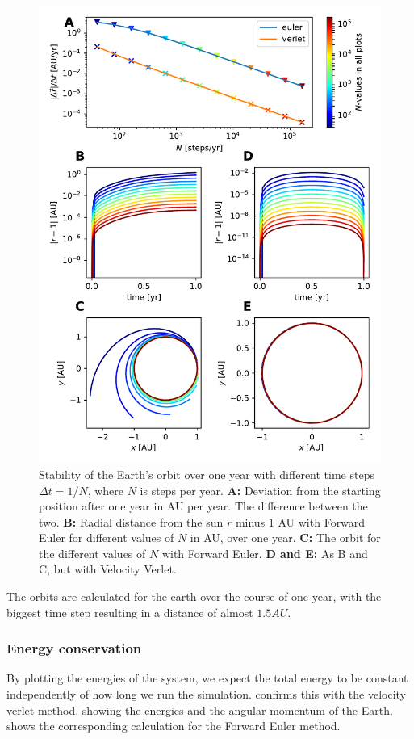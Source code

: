 \documentclass[10pt]{article}
\begin{document}
\begin{multicols}{2}
\begin{figure}[H]
    \centering
    \includegraphics[width=1.0\linewidth]{../results/stability.pdf}
    \caption{Stability of the Earth's orbit over one year with different
    time steps $\Delta t = 1/N$, where $N$ is steps per year. \textbf{A:}
    Deviation from the starting position after one year in AU per year. The
    difference between the two.
    \textbf{B:} Radial distance from the sun $r$ minus $1$ AU with Forward Euler for 
    different values of $N$ in AU, over one year. \textbf{C:} The orbit for
    the different values of $N$ with Forward Euler. \textbf{D and E:} As B
    and C, but with Velocity Verlet. }
    \label{fig:stability}
\end{figure}

The orbits are calculated for the earth over the course of one year, with
the biggest time step resulting in a distance of almost $1.5AU$.

\subsubsection{Energy conservation}
By plotting the energies of the system, we expect the total energy to be
constant independently of how long we run the simulation.
confirms this with the velocity verlet method, showing the energies and the
angular momentum of the Earth.  shows the
corresponding calculation for the Forward Euler method.


\end{multicols}
\end{document}
